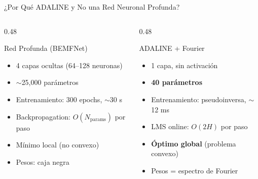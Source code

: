 \begin{frame}{¿Por Qué ADALINE y No una Red Neuronal Profunda?}
    \begin{columns}[T]
    \begin{column}{0.48\textwidth}
        \begin{block}{Red Profunda (BEMFNet)}
            \begin{itemize}
                \item 4 capas ocultas (64--128 neuronas)
                \item $\sim$25,000 parámetros
                \item Entrenamiento: 300 epochs, $\sim$30 s
                \item Backpropagation: $O(N_{\text{params}})$ por paso
                \item Mínimo local (no convexo)
                \item Pesos: caja negra
            \end{itemize}
        \end{block}
    \end{column}
    \begin{column}{0.48\textwidth}
        \begin{exampleblock}{ADALINE + Fourier}
            \begin{itemize}
                \item 1 capa, sin activación
                \item \textbf{40 parámetros}
                \item Entrenamiento: pseudoinversa, $\sim$12 ms
                \item LMS online: $O(2H)$ por paso
                \item \textbf{Óptimo global} (problema convexo)
                \item Pesos = espectro de Fourier
            \end{itemize}
        \end{exampleblock}
    \end{column}
    \end{columns}
    
    \vspace{0.4cm}
    
    \begin{center}
    \end{center}
\end{frame}

